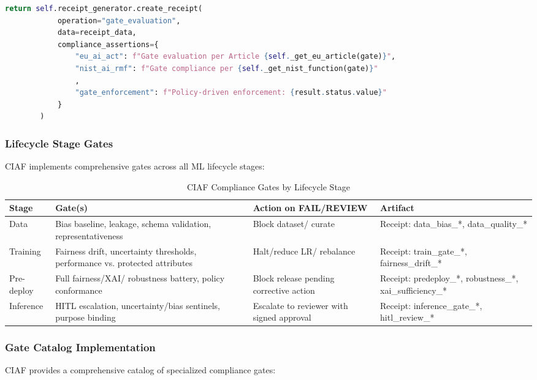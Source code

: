 \documentclass[12pt,a4paper]{article}
\begin{document}
\begin{lstlisting}[language=Python, caption=Gate Orchestrator Implementation]
        return self.receipt_generator.create_receipt(
            operation="gate_evaluation",
            data=receipt_data,
            compliance_assertions={
                "eu_ai_act": f"Gate evaluation per Article {self._get_eu_article(gate)}",
                "nist_ai_rmf": f"Gate compliance per {self._get_nist_function(gate)}"
                ,
                "gate_enforcement": f"Policy-driven enforcement: {result.status.value}"
            }
        )
\end{lstlisting}

\subsubsection{Lifecycle Stage Gates}

CIAF implements comprehensive gates across all ML lifecycle stages:

\begin{table}[H]
\centering
\footnotesize
\begin{tabular}{|p{2cm}|p{3.5cm}|p{3.5cm}|p{4cm}|}
\hline
\textbf{Stage} & \textbf{Gate(s)} & \textbf{Action on FAIL/REVIEW} & \textbf{Artifact} \\
\hline
Data & Bias baseline, leakage, schema validation, representativeness & Block dataset/ curate & Receipt: data\_bias\_*, data\_quality\_* \\
\hline
Training & Fairness drift, uncertainty thresholds, performance vs. protected attributes & Halt/reduce LR/ rebalance & Receipt: train\_gate\_*, fairness\_drift\_* \\
\hline
Pre-deploy & Full fairness/XAI/ robustness battery, policy conformance & Block release pending corrective action & Receipt: predeploy\_*, robustness\_*, xai\_sufficiency\_* \\
\hline
Inference & HITL escalation, uncertainty/bias sentinels, purpose binding & Escalate to reviewer with signed approval & Receipt: inference\_gate\_*, hitl\_review\_* \\
\hline
\end{tabular}
\caption{CIAF Compliance Gates by Lifecycle Stage}
\end{table}

\subsubsection{Gate Catalog Implementation}

CIAF provides a comprehensive catalog of specialized compliance gates:
\end{document}
